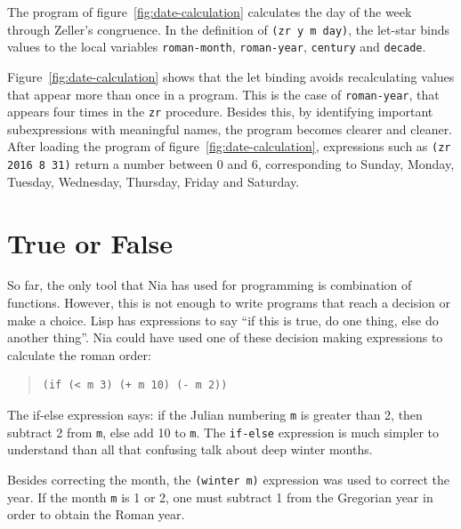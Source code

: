 \documentclass[a4paper,12pt]{book}
\begin{document}
The program of figure~\ref{fig:date-calculation}
calculates the day of the week
through Zeller's congruence. In the definition
of \verb|(zr y m day)|, the let-star 
binds values to the local variables \verb|roman-month|,
\verb|roman-year|, \verb|century| and \verb|decade|.

Figure~\ref{fig:date-calculation} shows that
the let binding avoids recalculating values that
appear more than once in a program. This
is the case of \verb|roman-year|, that
appears four times in the \verb|zr| procedure.
Besides this, by identifying important
subexpressions with meaningful names, the
program becomes clearer and cleaner.
After loading the program of
figure~\ref{fig:date-calculation},
expressions
such as
\verb|(zr 2016 8 31)| return
a number between 0 and 6, corresponding to
Sunday, Monday, Tuesday, Wednesday,
Thursday, Friday and Saturday.

\section{True or False}
So far, the only tool that Nia has used
for programming is combination of functions.
However, this is not enough to write
programs that reach a decision or
make a choice. Lisp has expressions
to say ``if this is true, do one thing,
else do another thing''. Nia 
could have used one of these decision
making expressions to calculate the roman
order:
\begin{quote}
\begin{verbatim}
(if (< m 3) (+ m 10) (- m 2))
\end{verbatim}
\end{quote}
The if-else expression says: if the
Julian numbering \verb|m| is greater
than 2, then subtract 2 from \verb|m|,
else add 10 to \verb|m|. The \verb|if-else|
expression is much simpler to understand
than all that confusing talk about deep
winter months.

Besides correcting the month, the \verb|(winter m)|
expression was used to correct the year. If
the month \verb|m| is 1 or 2, one must subtract
1 from the Gregorian year in order to obtain
the Roman year.
\end{document}
